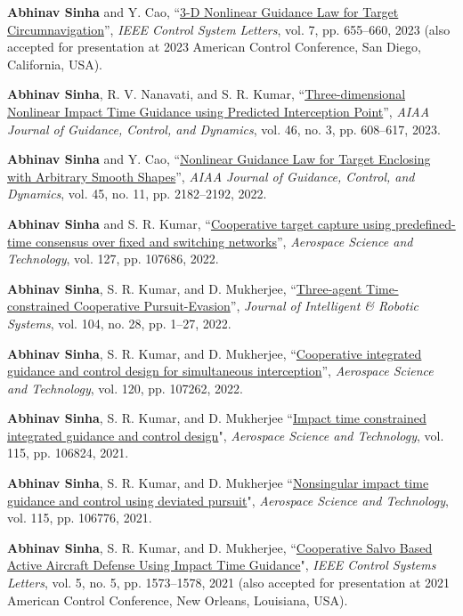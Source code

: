\begin{etaremune}[leftmargin=1cm]
		\item \textbf{Abhinav Sinha} and Y. Cao, ``\href{https://ieeexplore.ieee.org/abstract/document/9924233}{3-D Nonlinear Guidance Law for Target Circumnavigation}'', \emph{IEEE Control System Letters}, vol. 7, pp. 655--660, 2023 (also accepted for presentation at 2023 American Control Conference, San Diego, California, USA).
		\item \textbf{Abhinav Sinha}, R. V. Nanavati, and S. R. Kumar, ``\href{https://arc.aiaa.org/doi/10.2514/1.G007122}{Three-dimensional Nonlinear Impact Time Guidance using Predicted Interception Point}'', \emph{AIAA Journal of Guidance, Control, and Dynamics}, vol. 46, no. 3, pp. 608--617, 2023.
		\item \textbf{Abhinav Sinha} and Y. Cao, ``\href{https://arc.aiaa.org/doi/10.2514/1.G006957}{Nonlinear Guidance Law for Target Enclosing with Arbitrary Smooth Shapes}'', \emph{AIAA Journal of Guidance, Control, and Dynamics}, vol. 45, no. 11, pp. 2182--2192, 2022.
		\item \textbf{Abhinav Sinha} and S. R. Kumar, ``\href{https://www.sciencedirect.com/science/article/abs/pii/S1270963822003601}{Cooperative target capture using predefined-time consensus over fixed and switching networks}'', \emph{Aerospace Science and Technology}, vol. 127, pp. 107686, 2022.
		\item \textbf{Abhinav Sinha}, S. R. Kumar, and D. Mukherjee, ``\href{https://link.springer.com/article/10.1007/s10846-022-01570-y}{Three-agent Time-constrained Cooperative Pursuit-Evasion}'', \emph{Journal of Intelligent \& Robotic Systems}, vol. 104, no. 28, pp. 1--27, 2022.
		\item \textbf{Abhinav Sinha}, S. R. Kumar, and D. Mukherjee, ``\href{https://www.sciencedirect.com/science/article/abs/pii/S1270963821007720}{Cooperative integrated guidance and control design for simultaneous interception}'', \emph{Aerospace Science and Technology}, vol. 120, pp. 107262, 2022.
	\item \textbf{Abhinav Sinha}, S. R. Kumar, and D. Mukherjee ``\href{https://doi.org/10.1016/j.ast.2021.106824}{Impact time constrained integrated guidance and control design}", \emph{Aerospace Science and Technology}, vol. 115, pp. 106824, 2021.
	\item \textbf{Abhinav Sinha}, S. R. Kumar, and D. Mukherjee ``\href{https://doi.org/10.1016/j.ast.2021.106776}{Nonsingular impact time guidance and control using deviated pursuit}", \emph{Aerospace Science and Technology}, vol. 115, pp. 106776, 2021.
	\item \textbf{Abhinav Sinha}, S. R. Kumar, and D. Mukherjee, ``\href{https://ieeexplore.ieee.org/document/9274339}{Cooperative Salvo Based Active Aircraft Defense Using Impact Time Guidance}",	\emph{IEEE Control Systems Letters}, vol. 5, no. 5, pp. 1573--1578, 2021 (also accepted for presentation at 2021 American Control Conference, New Orleans, Louisiana, USA).

\end{etaremune}

